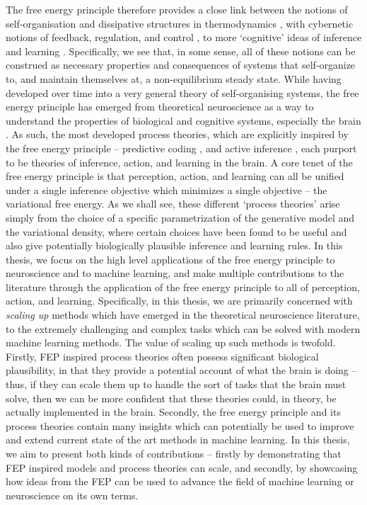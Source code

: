 The  free energy principle therefore provides a close link between the notions of self-organisation and dissipative structures in thermodynamics \citep{prigogine1973theory,seifert2008stochastic}, with cybernetic notions of feedback, regulation, and control \citep{wiener2019cybernetics,kalman1960contributions,johnson2005pid}, to more `cognitive' ideas of inference and learning \citep{schmidhuber1991possibility,dayan2008decision,rao1999predictive}. Specifically, we see that, in some sense, all of these notions can be construed as necessary properties and consequences of systems that self-organize to, and maintain themselves at, a non-equilibrium steady state. While having developed over time into a very general theory of self-organising systems, the free energy principle has emerged from theoretical neuroscience as a way to understand the properties of biological and cognitive systems, especially the brain \citep{friston2003learning,friston2006free}. As such, the most developed process theories, which are explicitly inspired by the  free energy principle -- predictive coding \citep{mumford1992computational,rao1999predictive,friston2005theory}, and active inference \citep{friston2012active,friston2015active,friston2017active}, each purport to be theories of inference, action, and learning in the brain. A core tenet of the  free energy principle is that perception, action, and learning can all be unified under a single inference objective which minimizes a single objective -- the variational free energy. As we shall see, these different `process theories' arise simply from the choice of a specific parametrization of the generative model and the variational density, where certain choices have been found to be useful and also give potentially biologically plausible inference and learning rules. In this thesis, we focus on the high level applications of the free energy principle to neuroscience and to machine learning, and make multiple contributions to the literature through the application of the free energy principle to all of perception, action, and learning. Specifically, in this thesis, we are primarily concerned with \emph{scaling up} methods which have emerged in the theoretical neuroscience literature, to the extremely challenging and complex tasks which can be solved with modern machine learning methods. The value of scaling up such methods is twofold. Firstly, FEP inspired process theories often possess significant biological plausibility, in that they provide a potential account of what the brain is doing -- thus, if they can scale them up to handle the sort of tasks that the brain must solve, then we can be more confident that these theories could, in theory, be actually implemented in the brain. Secondly, the free energy principle and its process theories contain many insights which can potentially be used to improve and extend current state of the art methods in machine learning. In this thesis, we aim to present both kinds of contributions -- firstly by demonstrating that FEP inspired models and process theories can scale, and secondly, by showcasing how ideas from the FEP can be used to advance the field of machine learning or neuroscience on its own terms. 


